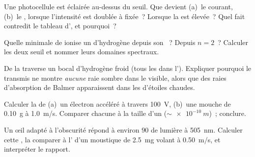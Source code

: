 \begin{exercise}[$\star\star$]\label{exo:g12:quantum-world:7}
Une photocellule est éclairée au-dessus du seuil. Que devient (a)~le
courant, (b)~le , lorsque
l'intensité est doublée à  fixée~?
Lorsque la  est élevée~? Quel fait
contredit le tableau d', et pourquoi~?
\end{exercise}

\begin{exercise}[$\star\star$]\label{exo:g12:quantum-world:8}
Quelle  minimale de
 ionise un
 d'hydrogène depuis son
~? Depuis $n = 2$~? Calculer les
deux  seuil et nommer leurs
domaines spectraux.
\end{exercise}

\begin{exercise}[$\star\star$]\label{exo:g12:quantum-world:9}
De la  traverse un bocal d'hydrogène
froid (tous les  dans l'). Expliquer pourquoi le
 transmis ne montre \emph{aucune} raie
sombre dans le visible, alors que des raies d'absorption de Balmer
apparaissent dans les  d'étoiles chaudes.
\end{exercise}

\begin{exercise}[$\star\star$]\label{exo:g12:quantum-world:10}
Calculer la  de
(a)~un électron accéléré à travers \qty{100}{V}, (b)~une mouche de
\qty{0.10}{g} à \qty{1.0}{m/s}. Comparer chacune à la taille d'un
 ($\sim \qty{e-10}{m}$)~; conclure.
\end{exercise}

\begin{exercise}[$\star\star$]\label{exo:g12:quantum-world:11}
Un œil adapté à l'obscurité répond à environ $90$
 de lumière à \qty{505}{nm}. Calculer cette
, la comparer à
l' d'un moustique de
\qty{2.5}{mg} volant à \qty{0.50}{m/s}, et interpréter le rapport.
\end{exercise}

